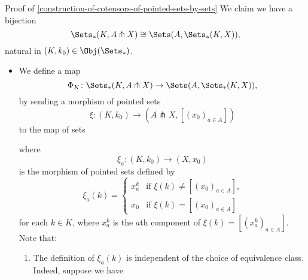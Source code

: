 \begin{Proof}{Proof of \cref{construction-of-cotensors-of-pointed-sets-by-sets}}%
    We claim we have a bijection
    \[
         \Sets_{*}(K,A\pitchfork X)%
         \cong%
         \Sets(A,\Sets_{*}(K,X)),%
    \]%
    natural in $(K,k_{0})\in\Obj(\Sets_{*})$.%
    \begin{itemize}
        \item{}We define a map
            \[
                \Phi_{K}%
                \colon%
                \Sets_{*}(K,A\pitchfork X)%
                \to%
                \Sets(A,\Sets_{*}(K,X)),%
            \]%
            by sending a morphism of pointed sets
            \[
                \xi%
                \colon%
                (K,k_{0})%
                \to%
                (A\pitchfork X,[(x_{0})_{a\in A}])%
            \]%
            to the map of sets%
            \begin{webcompile}
                \phantom{\xi^{\dagger}\colon}
            \end{webcompile}
            where
            \[
                \xi_{a}%
                \colon%
                (K,k_{0})%
                \to%
                (X,x_{0})%
            \]%
            is the morphism of pointed sets defined by
            \[
                \xi_{a}(k)%
                =%
                \begin{cases}
                    x^{k}_{a} &\text{if $\xi(k)\neq[(x_{0})_{a\in A}]$,}\\%
                    x_{0}     &\text{if $\xi(k)=[(x_{0})_{a\in A}]$}%
                \end{cases}
            \]%
            for each $k\in K$, where $x^{k}_{a}$ is the $a$th component of $\xi(k)=[(x^{k}_{a})_{a\in A}]$. Note that:
            \begin{enumerate}
                \item The definition of $\xi_{a}(k)$ is independent of the choice of equivalence class. Indeed, suppose we have

\end{enumerate}
\end{itemize}
\end{Proof}
